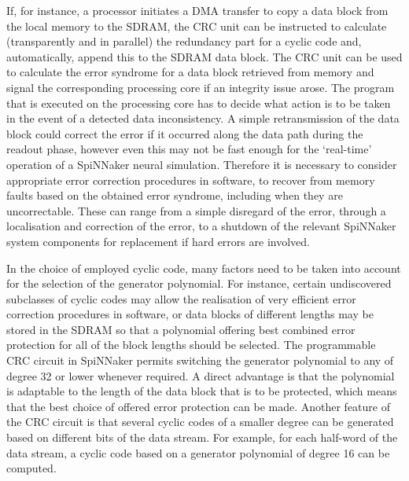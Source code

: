 \documentclass[a4paper, 11pt]{article}
\begin{document}
If, for instance, a processor initiates a DMA transfer to copy a data block from the local memory to the SDRAM, the CRC unit can be instructed to calculate (transparently and in parallel) the redundancy part for a cyclic code and, automatically, append this to the SDRAM data block. The CRC unit can be used to calculate the error syndrome for a data block retrieved from memory and signal the corresponding processing core if an integrity issue arose. The program that is executed on the processing core has to decide what action is to be taken in the event of a detected data inconsistency. A simple retransmission of the data block could correct the error if it occurred along the data path during the readout phase, however even this may not be fast enough for the `real-time' operation of a SpiNNaker neural simulation. Therefore it is necessary to consider appropriate error correction procedures in software, to recover from memory faults based on the obtained error syndrome, including when they are uncorrectable. These can range from a simple disregard of the error, through a localisation and correction of the error, to a shutdown of the relevant SpiNNaker system components for replacement if hard errors are involved.

In the choice of employed cyclic code, many factors need to be taken into account for the selection of the generator polynomial. For instance, certain undiscovered subclasses of cyclic codes may allow the realisation of very efficient error correction procedures in software, or data blocks of different lengths may be stored in the SDRAM so that a polynomial offering best combined error protection for all of the block lengths should be selected. The programmable CRC circuit in SpiNNaker permits switching the generator polynomial to any of degree 32 or lower whenever required. A direct advantage is that the polynomial is adaptable to the length of the data block that is to be protected, which means that the best choice of offered error protection can be made. Another feature of the CRC circuit is that several cyclic codes of a smaller degree can be generated based on different bits of the data stream. For example, for each half-word of the data stream, a cyclic code based on a generator polynomial of degree 16 can be computed.
\end{document}
